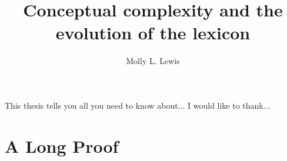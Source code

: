 \documentclass[12pt]{report}
\begin{document}
\title{Conceptual complexity and the evolution of the lexicon}
\author{Molly L. Lewis}
 
\beforepreface 
{}
This thesis tells you all you need to know about...
I would like to thank...



\afterpreface









\appendix
\chapter{A Long Proof}



\end{document}
